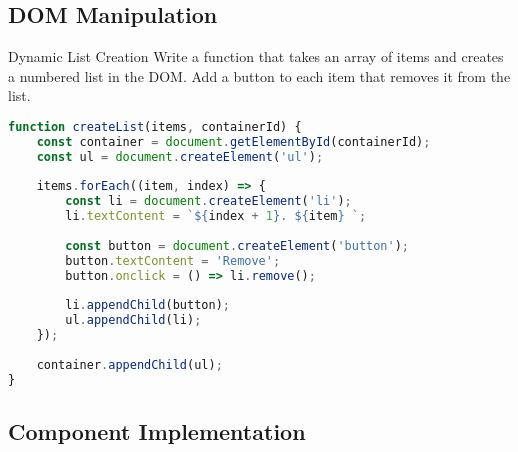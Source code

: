 \subsection{DOM Manipulation}

\begin{example2}{Dynamic List Creation}
Write a function that takes an array of items and creates a numbered list in the DOM. Add a button to each item that removes it from the list.

\begin{lstlisting}[language=JavaScript, style=basesmol]
function createList(items, containerId) {
    const container = document.getElementById(containerId);
    const ul = document.createElement('ul');
    
    items.forEach((item, index) => {
        const li = document.createElement('li');
        li.textContent = `${index + 1}. ${item} `;
        
        const button = document.createElement('button');
        button.textContent = 'Remove';
        button.onclick = () => li.remove();
        
        li.appendChild(button);
        ul.appendChild(li);
    });
    
    container.appendChild(ul);
}
\end{lstlisting}
\end{example2}

\subsection{Component Implementation}

